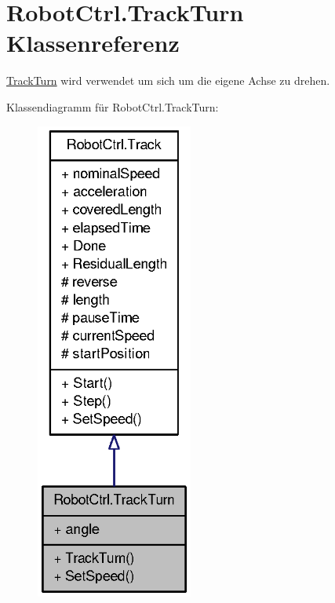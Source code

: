 \hypertarget{class_robot_ctrl_1_1_track_turn}{
\section{RobotCtrl.TrackTurn Klassenreferenz}
\label{class_robot_ctrl_1_1_track_turn}
}


\hyperlink{class_robot_ctrl_1_1_track_turn}{TrackTurn} wird verwendet um sich um die eigene Achse zu drehen.  




Klassendiagramm für RobotCtrl.TrackTurn:\nopagebreak
\begin{figure}[H]
\begin{center}
\leavevmode
\includegraphics[width=146pt]{class_robot_ctrl_1_1_track_turn__inherit__graph}
\end{center}
\end{figure}


